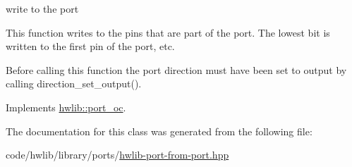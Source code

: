 write to the port

This function writes to the pins that are part of the port. The lowest bit is written to the first pin of the port, etc.

Before calling this function the port direction must have been set to output by calling direction\+\_\+set\+\_\+output(). 

Implements \hyperlink{classhwlib_1_1port__oc_aa5889aedda709f045730db9859e4fcf4}{hwlib\+::port\+\_\+oc}.



The documentation for this class was generated from the following file\+:\begin{DoxyCompactItemize}
\item 
code/hwlib/library/ports/\hyperlink{hwlib-port-from-port_8hpp}{hwlib-\/port-\/from-\/port.\+hpp}\end{DoxyCompactItemize}
